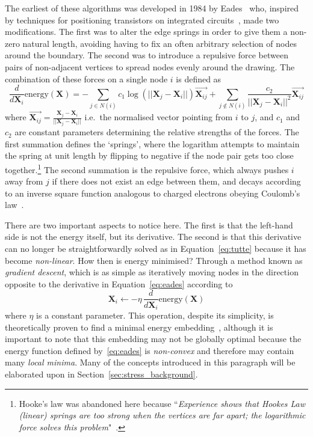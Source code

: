 The earliest of these algorithms was developed in 1984 by Eades~\cite{Eades1984} who, inspired by techniques for positioning transistors on integrated circuits~\cite{Quinn1979}, made two modifications. The first was to alter the edge springs in order to give them a non-zero natural length, avoiding having to fix an often arbitrary selection of nodes around the boundary. The second was to introduce a repulsive force between pairs of non-adjacent vertices to spread nodes evenly around the drawing.
The combination of these forces on a single node $i$ is defined as
\begin{equation}
    \frac{d}{d\mathbf{X}_i}\mathrm{energy}(\mathbf{X}) = -\sum_{j\in N(i)}c_1\log(||\mathbf{X}_j-\mathbf{X}_i||)\overrightarrow{\mathbf{X}_{ij}}
    + \sum_{j\notin N(i)}\frac{c_2}{||\mathbf{X}_j-\mathbf{X}_i||^2}\overrightarrow{\mathbf{X}_{ij}}
\label{eq:eades}
\end{equation}
where $\overrightarrow{\mathbf{X}_{ij}} = \frac{\mathbf{X}_j-\mathbf{X}_i}{||\mathbf{X}_j-\mathbf{X}_i||}$ i.e.\ the normalised vector pointing from $i$ to $j$, and $c_1$ and $c_2$ are constant parameters determining the relative strengths of the forces. The first summation defines the `springs', where the logarithm attempts to maintain the spring at unit length by flipping to negative if the node pair gets too close together.\footnote{Hooke's law was abandoned here because ``\emph{Experience shows that Hookes Law (linear) springs are too strong when the vertices are far apart; the logarithmic force solves this problem}"~\cite{Eades1984}.}
The second summation is the repulsive force, which always pushes $i$ away from $j$ if there does not exist an edge between them, and decays according to an inverse square function analogous to charged electrons obeying Coulomb's law~\cite{Coulomb1785}.

There are two important aspects to notice here. The first is that the left-hand side is not the energy itself, but its derivative. The second is that this derivative can no longer be straightforwardly solved as in Equation~\eqref{eq:tutte} because it has become \emph{non-linear}. How then is energy minimised? Through a method known as \emph{gradient descent}, which is as simple as iteratively moving nodes in the direction opposite to the derivative in Equation~\eqref{eq:eades} according to
\begin{equation}
    \mathbf{X}_i \leftarrow -\eta\, \frac{d}{d\mathbf{X}_i}\mathrm{energy}(\mathbf{X})
\label{eq:gradient_descent}
\end{equation}
where $\eta$ is a constant parameter.
This operation, despite its simplicity, is theoretically pro\-ven to find a minimal energy embedding~\cite{Cauchy1847}, although it is important to note that this embedding may not be globally optimal because the energy function defined by~\eqref{eq:eades} is \emph{non-convex} and therefore may contain many \emph{local minima}. Many of the concepts introduced in this paragraph will be elaborated upon in Section~\ref{sec:stress_background}.

